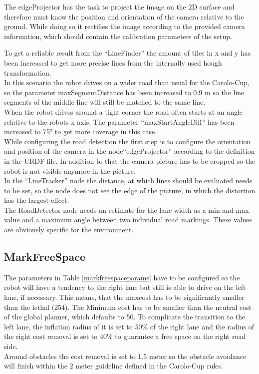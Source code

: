 The edgeProjector has the task to project the image on the 2D surface and therefore must know the position and orientation of the camera relative to the ground. While doing so it rectifies the image according to the provided camera information, which should contain the calibration parameters of the setup.

To get a reliable result from the ``LineFinder'' the amount of tiles in x and y has been increased to get more precise lines from the internally used hough transformation.\\
In this scenario the robot drives on a wider road than usual for the Carolo-Cup, so the parameter maxSegmentDistance has been increased to 0.9 m so the line segments of the middle line will still be matched to the same line.\\
When the robot drives around a tight corner the road often starts at an angle relative to the robots x axis. The parameter ``maxStartAngleDiff'' has been increased to 75° to get more coverage in this case.\\

While configuring the road detection the first step is to configure the orientation and position of the camera in the node``edgeProjector'' according to the definition in the URDF file. In addition to that the camera picture has to be cropped so the robot is not visible anymore in the picture.\\

In the ``LineTracker'' node the distance, at which lines should be evaluated needs to be set, so the node does not see the edge of the picture, in which the distortion has the largest effect.\\


The RoadDetector node needs an estimate for the lane width as a min and max value and a maximum angle between two individual road markings. These values are obviously specific for the environment.\\

\subsection{MarkFreeSpace}

The parameters in Table \ref{markfreespaceparams} have to be configured so the robot will have a tendency to the right lane but still is able to drive on the left lane, if necessary. This means, that the maxcost has to be significantly smaller than the lethal (254). The Minimum cost has to be smaller than the neutral cost of the global planner, which defaults to 50. To complicate the transition to the left lane, the inflation radius of it is set to 50\% of the right lane and the radius of the right cost removal  is set to 40\% to guarantee a free space on the right road side.\\
Around obstacles the cost removal is set to 1.5 meter so the obstacle avoidance will finish within the 2 meter guideline defined in the Carolo-Cup rules\cite{carolocup}.\\

